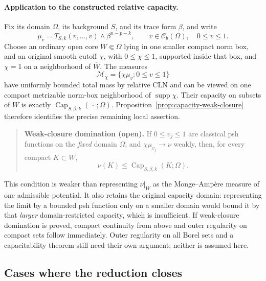 \documentclass[11pt,a4paper]{article}
\numberwithin{equation}{section}
\theoremstyle{definition}
\theoremstyle{remark}
\newcommand{\Cb}{\mathcal C_b}
\begin{document}
\paragraph{Application to the constructed relative capacity.}
Fix its domain $\Omega$, its background $S$, and its trace form
$\beta$, and write
\[
 \mu_v=T_{S,k}(v,\ldots,v)\wedge\beta^{n-p-k},
 \qquad v\in\Cb(\Omega),\quad0\leq v\leq1.
\]
Choose an ordinary open core $W\Subset\Omega$ lying in one smaller
compact norm box, and an original smooth cutoff $\chi$, with
$0\leq\chi\leq1$, supported inside that box, and
$\chi=1$ on a neighborhood of $\overline W$. The measures
\[
 \mathcal M_\chi=\{\chi\mu_v:0\leq v\leq1\}
\]
have uniformly bounded total mass by relative CLN and can be viewed
on one compact metrizable norm-box neighborhood of
$\operatorname{supp}\chi$. Their capacity on subsets of $W$ is
exactly $\operatorname{Cap}_{S,\beta,k}(\,\cdot\,;\Omega)$.
Proposition~\ref{prop:capacity-weak-closure} therefore identifies the
precise remaining local assertion.

\begin{quote}
\textbf{Weak-closure domination (open).}
If $0\leq v_j\leq1$ are classical psh functions on the
\emph{fixed} domain $\Omega$, and
$\chi\mu_{v_j}\to\nu$ weakly, then, for every compact
$K\subset W$,
\[
 \nu(K)\leq
 \operatorname{Cap}_{S,\beta,k}(K;\Omega).
\]
\end{quote}

This condition is weaker than representing $\nu|_W$ as the
Monge--Amp\`ere measure of one admissible potential. It also retains
the original capacity domain: representing the limit by a bounded
psh function only on a smaller domain would bound it by that
\emph{larger} domain-restricted capacity, which is insufficient.
If weak-closure domination is proved, compact continuity from above
and outer regularity on compact sets follow immediately. Outer
regularity on all Borel sets and a capacitability theorem still need
their own argument; neither is assumed here.

\subsection{Cases where the reduction closes}
\end{document}
